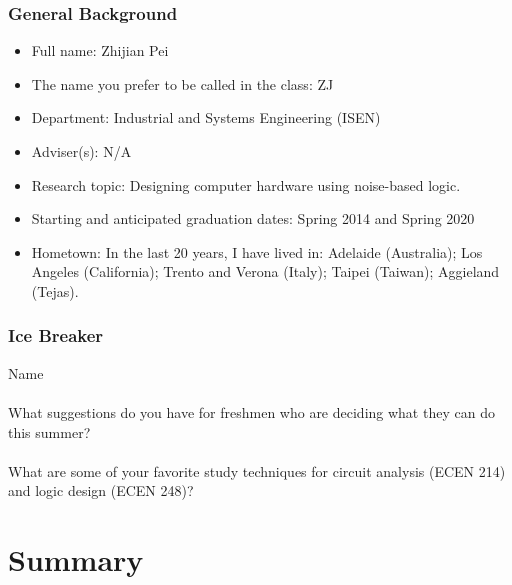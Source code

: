 \documentclass[xcolor={usenames,dvipsnames},hyperref={hyperindex,bookmarks}]{beamer}
\begin{document}
\frame
{
	\frametitle{General Background}

	\begin{itemize}
	\item Full name: Zhijian Pei
	\item The name you prefer to be called in the class: ZJ
	\item Department: Industrial and Systems Engineering (ISEN)
	\item Adviser(s): N/A
	\item Research topic: Designing computer hardware using noise-based logic.
	\item Starting and anticipated graduation dates: Spring 2014 and Spring 2020
	\item Hometown: In the last 20 years, I have lived in: Adelaide (Australia); Los Angeles (California); Trento and Verona (Italy); Taipei (Taiwan); Aggieland (Tejas).
	\end{itemize}
}






\frame
{
	\frametitle{Ice Breaker}

	Name \\
	\ \\
	What suggestions do you have for freshmen who are deciding what they can do this summer? \\
	\ \\
	What are some of your favorite study techniques for circuit analysis (ECEN 214) and logic design (ECEN 248)? \\
}








\section{Summary}
\end{document}
